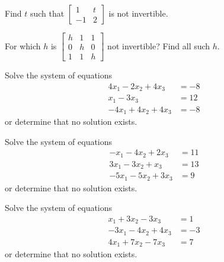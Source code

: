 \documentclass{ximera}
\begin{document}
\begin{exercise}%
    Find $t$ such that
    $\left[ 
        \begin{smallmatrix}
            1 & t \\
            -1 & 2
        \end{smallmatrix}
    \right]$
    is not invertible.
\end{exercise}

\begin{exercise}
    For which $h$ is
    $\left[ 
        \begin{smallmatrix}
            h & 1 & 1 \\
            0 & h & 0 \\
            1 & 1 & h
        \end{smallmatrix} 
    \right]$
    not invertible?  Find all such $h$.
\end{exercise}

\begin{exercise}%
    Solve the system of equations
    \begin{equation*}
        \begin{split}
             4x_1 - 2x_2 + 4x_3 &= -8 \\ 
             x_1 - 3x_3 &= 12\\
            -4x_1 + 4x_2 + 4x_3 &= -8 
        \end{split}
    \end{equation*}
    or determine that no solution exists.
\end{exercise}

\begin{exercise}%
    Solve the system of equations
    \begin{equation*}
        \begin{split}
             -x_1 - 4x_2 + 2x_3 &= 11 \\ 
             3x_1 -3x_2 + x_3 &= 13\\
            -5x_1 - 5x_2 + 3x_3 &= 9 
        \end{split}
    \end{equation*}
    or determine that no solution exists.
\end{exercise}

\begin{exercise}%
    Solve the system of equations
    \begin{equation*}
        \begin{split}
            x_1 + 3x_2 - 3x_3 &= 1 \\ 
             -3x_1 - 4x_2  +4x_3 &= -3\\
            4x_1 + 7x_2 - 7x_3 &= 7 
        \end{split}
    \end{equation*}
    or determine that no solution exists.
\end{exercise}
\end{document}
